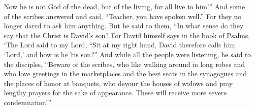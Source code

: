 \begin{biblechapter}
\verse Now he is not God of the dead, but of the living, for all live to him!”
\verse And some of the scribes answered and said, “Teacher, you have spoken well.”
\verse For they no longer dared to ask him anything.
 But he said to them, “In what sense do they say that the Christ is David’s son?
\verse For David himself says in the book of Psalms,
\verse ‘The Lord said to my Lord, 
“Sit at my right hand,
\verse David therefore calls him ‘Lord,’ and how is he his son?”
 And while all the people were listening, he said to the disciples,
\verse “Beware of the scribes, who like walking around in long robes and who love greetings in the marketplaces and the best seats in the synagogues and the places of honor at banquets,
\verse who devour the houses of widows and pray lengthy prayers for the sake of appearance. These will receive more severe condemnation!”
\end{biblechapter}

